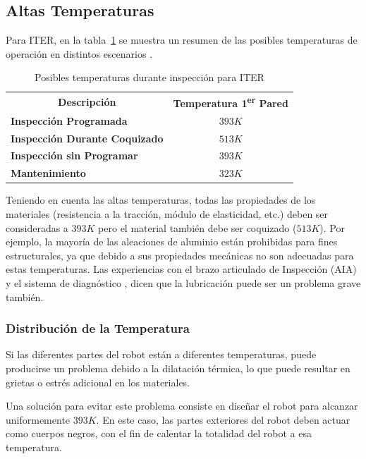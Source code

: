 \subsection*{Altas Temperaturas}
Para ITER, en la tabla~\ref{tab:temperature} se muestra un resumen de las posibles temperaturas de operación en distintos escenarios \cite{ITEROrg.2004}.

\begin{table} [htbp]
\centering
	\caption{Posibles temperaturas durante inspección para ITER}
	\label{tab:temperature}
	\begin{tabular}{c c}
		
		\textbf{Descripción} 	& \textbf{Temperatura 1\textsuperscript{er} Pared}\\ 
		
		\multicolumn{1}{l}{\textbf{Inspección Programada}} 	& 			$393 K$   \\ 
		\multicolumn{1}{l}{\textbf{Inspección Durante Coquizado}} 	& 		$513 K$   \\ 
		\multicolumn{1}{l}{\textbf{Inspección sin Programar}} 		& 	$393 K$   \\ 
		\multicolumn{1}{l}{\textbf{Mantenimiento}} 					& 	$323 K$   \\ 
		
	\end{tabular} 	
\end{table}

Teniendo en cuenta las altas temperaturas, todas las propiedades de los materiales  (resistencia a la tracción, módulo de elasticidad, etc.) deben ser consideradas a $393 K$ pero el material también debe ser coquizado ($513 K$). Por ejemplo, la mayoría de las aleaciones de aluminio están prohibidas para fines estructurales, ya que debido a sus propiedades mecánicas no son adecuadas para estas temperaturas. Las experiencias con el brazo articulado de Inspección (AIA) \cite{Keller2009} y el sistema de diagnóstico \cite{Smick2005}, dicen que la lubricación puede ser un problema grave también.

\subsubsection*{Distribución de la Temperatura}
Si las diferentes partes del robot están a diferentes temperaturas, puede producirse un problema debido a la dilatación térmica, lo que puede resultar en grietas o estrés adicional en los materiales.

Una solución para evitar este problema consiste en diseñar el robot para alcanzar uniformemente $393 K $. En este caso, las partes exteriores del robot deben actuar como cuerpos negros, con el fin de calentar la totalidad del robot a esa temperatura.

